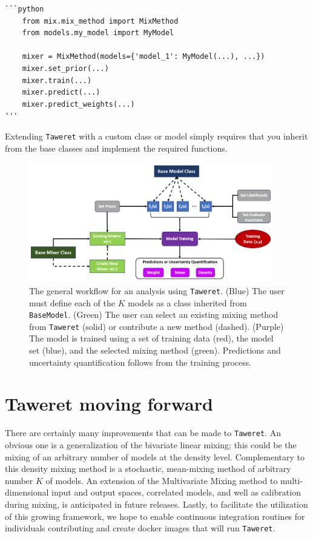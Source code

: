 \documentclass[10pt, preprint,aps,prc,floatfix,
tightenlines,
nofootinbib,superscriptaddress]{revtex4-2}
\begin{document}
\begin{verbatim}
```python
    from mix.mix_method import MixMethod
    from models.my_model import MyModel
    
    mixer = MixMethod(models={'model_1': MyModel(...), ...})
    mixer.set_prior(...)
    mixer.train(...)
    mixer.predict(...)
    mixer.predict_weights(...)
'''    
\end{verbatim}
Extending \texttt{Taweret} with a custom class or model simply requires that you inherit from the base classes and implement the required functions. 

\begin{figure}
    \centering
    \includegraphics[width = 0.95\textwidth, height = 0.45\textwidth]{Taweret_JOSS.png}
    \caption{The general workflow for an analysis using \texttt{Taweret}. (Blue) The user must define each of the $K$ models as a class inherited from \texttt{BaseModel}. (Green) The user can select an existing mixing method from \texttt{Taweret} (solid) or contribute a new method (dashed). (Purple) The model is trained using a set of training data (red), the model set (blue), and the selected mixing method (green). Predictions and uncertainty quantification follows from the training process. }
    \label{fig:taweret_workflow}
\end{figure}

\section{Taweret moving forward}

There are certainly many improvements that can be made to \texttt{Taweret}. 
An obvious one is a generalization of the bivariate linear mixing; this could be the mixing of an arbitrary number of models at the density level.
Complementary to this density mixing method is a stochastic, mean-mixing method of arbitrary number $K$ of models.
An extension of the Multivariate Mixing method to multi-dimensional input and output spaces, correlated models, and well as calibration during mixing, is anticipated in future releases.
Lastly, to facilitate the utilization of this growing framework, we hope to enable continuous integration routines for individuals contributing and create docker images that will run \texttt{Taweret}.
\end{document}
